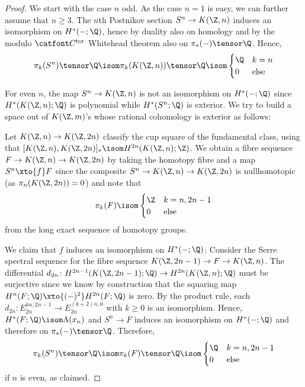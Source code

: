 \begin{proof}
	We start with the case $n$ odd.
	As the case $n = 1$ is easy, we can further assume that $n \geq 3$.
	The $n$th Postnikov section $S^n \to K(\Z, n)$ induces an isomorphism on $H^*({{-}}; \Q)$, hence by duality also on homology and by the modulo $\Ctor$ Whitehead theorem also on $\pi_*({{-}}) \tensor \Q$.
	Hence,
	\begin{equation*}
		\pi_k(S^n) \tensor \Q \isom \pi_k(K(\Z, n)) \tensor \Q \isom \begin{cases}
			\Q 	& k = n \\
			0 	& \text{else}
		\end{cases}
	\end{equation*}

	For even $n$, the map $S^n \to K(\Z, n)$ is not an isomorphism on $H^*({{-}}; \Q)$ since $H^*(K(\Z, n); \Q)$ is polynomial while $H^*(S^n; \Q)$ is exterior.
	We try to build a space out of $K(\Z, m)$'s whose rational cohomology is exterior as follows:

	Let $K(\Z, n) \to K(\Z, 2n)$ classify the cup square of the fundamental class, using that $[K(\Z, n), K(\Z, 2n)]_* \isom H^{2n}(K(\Z, n); \Z)$.
	We obtain a fibre sequence $F \to K(\Z, n) \to K(\Z, 2n)$ by taking the homotopy fibre and a map $S^n \xto{f} F$ since the composite $S^n \to K(\Z, n) \to K(\Z, 2n)$ is nullhomotopic (as $\pi_n(K(\Z, 2n)) = 0$) and note that
	\begin{equation*}
		\pi_k(F) \isom \begin{cases}
			\Z 	& k = n, 2n - 1 \\
			0 	& \text{else}
		\end{cases}
	\end{equation*}
	from the long exact sequence of homotopy groups.

	We claim that $f$ induces an isomorphism on $H^*({{-}}; \Q)$:
	Consider the Serre spectral sequence for the fibre sequence $K(\Z, 2n - 1) \to F \to K(\Z, n)$.
	The differential $d_{2n}\colon H^{2n - 1}(K(\Z, 2n - 1); \Q) \to H^{2n}(K(\Z, n); \Q)$ must be surjective since we know by construction that the squaring map $H^n(F; \Q) \xto{({{-}})^2} H^{2n}(F; \Q)$ is zero.
	By the product rule, each $d_{2n}\colon E_{2n}^{kn, 2n - 1} \to E_{2n}^{(k + 2)n, 0}$ with $k \geq 0$ is an isomorphism.
	Hence, $H^*(F; \Q) \isom \Lambda(x_n)$ and $S^n \to F$ induces an isomorphism on $H^*({{-}}; \Q)$ and therefore on $\pi_*({{-}}) \tensor \Q$.
	Therefore,
	\begin{equation*}
		\pi_k(S^n) \tensor \Q \isom \pi_k(F) \tensor \Q \isom \begin{cases}
			\Q 	& k = n, 2n - 1 \\
			0 	& \text{else}
		\end{cases}
	\end{equation*}
	if $n$ is even, as claimed.
\end{proof}
